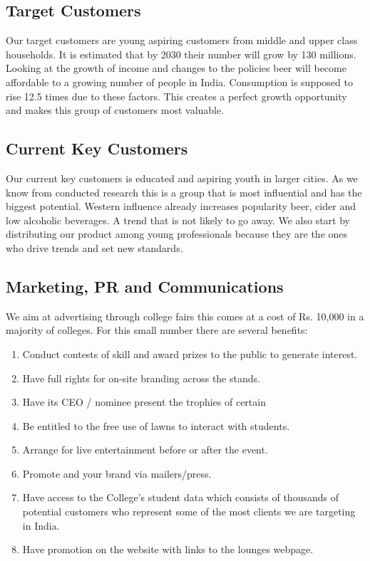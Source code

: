 \documentclass[11pt]{article}
\begin{document}
  \subsection{Target Customers}
  Our target customers are young aspiring customers from middle and upper class households.
  It is estimated that by 2030 their number will grow by 130 millions.
  Looking at the growth of income and changes to the policies beer will become affordable to a growing number of people in India.
  Consumption is supposed to rise 12.5 times due to these factors.
  This creates a perfect growth opportunity and makes this group of customers most valuable.

  \subsection{Current Key Customers}
  Our current key customers is educated and aspiring youth in larger cities.
  As we know from conducted research this is a group that is most influential and has the biggest potential.
  Western influence already increases popularity beer, cider and low alcoholic beverages.
  A trend that is not likely to go away.
  We also start by distributing our product among young professionals because they are the ones who drive trends and set new standards.

  \subsection{Marketing, PR and Communications}
We aim at advertising through college fairs this comes at a cost of Rs. 10,000 in a majority of colleges. For this small number there are several benefits:
\begin{enumerate}
\item Conduct contests of skill and award prizes to the public to generate interest.
\item Have full rights for on-site branding across the stands.
\item Have its CEO / nominee present the trophies of certain
\item Be entitled to the free use of lawns to interact with students.
\item Arrange for live entertainment before or after the event.
\item Promote and your brand via mailers/press.
\item Have access to the College's student data which consists of thousands of potential customers who represent some of the most clients we are targeting in India.
\item Have promotion on the website with links to the lounges webpage.
\end{enumerate}
\end{document}
